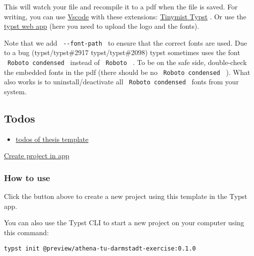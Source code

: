 \begin{Shaded}
\begin{Highlighting}[]
 
\end{Highlighting}
\end{Shaded}

This will watch your file and recompile it to a pdf when the file is
saved. For writing, you can use
\href{https://code.visualstudio.com/}{Vscode} with these extensions:
\href{https://marketplace.visualstudio.com/items?itemName=myriad-dreamin.tinymist}{Tinymist
Typst} . Or use the \href{https://typst.app/}{typst web app} (here you
need to upload the logo and the fonts).

Note that we add \texttt{\ -\/-font-path\ } to ensure that the correct
fonts are used. Due to a bug (typst/typst\#2917 typst/typst\#2098) typst
sometimes uses the font \texttt{\ Roboto\ condensed\ } instead of
\texttt{\ Roboto\ } . To be on the safe side, double-check the embedded
fonts in the pdf (there should be no \texttt{\ Roboto\ condensed\ } ).
What also works is to uninstall/deactivate all
\texttt{\ Roboto\ condensed\ } fonts from your system.

\subsection{Todos}\label{todos}

\begin{itemize}
\tightlist
\item
  \href{https://github.com/JeyRunner/tuda-typst-templates/blob/main/templates/tudapub/TODO.md}{todos
  of thesis template}
\end{itemize}

\href{/app?template=athena-tu-darmstadt-exercise&version=0.1.0}{Create
project in app}

\subsubsection{How to use}\label{how-to-use}

Click the button above to create a new project using this template in
the Typst app.

You can also use the Typst CLI to start a new project on your computer
using this command:

\begin{verbatim}
typst init @preview/athena-tu-darmstadt-exercise:0.1.0
\end{verbatim}

